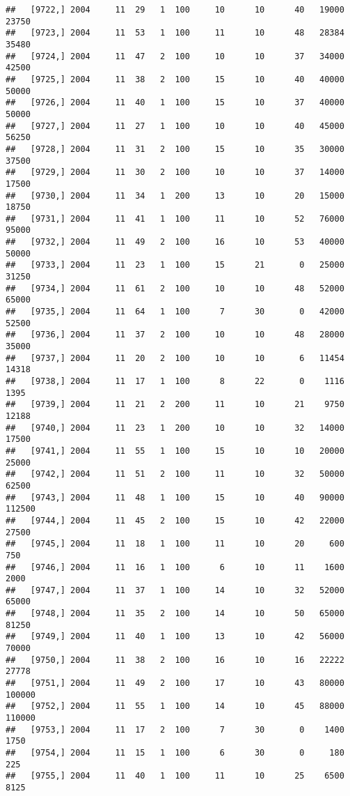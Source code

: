 \documentclass{article}\usepackage[]{graphicx}\usepackage[]{color}
\makeatletter
\newenvironment{kframe}{%
 \def\at@end@of@kframe{}%
 \ifinner\ifhmode%
  \def\at@end@of@kframe{\end{minipage}}%
  \begin{minipage}{\columnwidth}%
 \fi\fi%
 \def\FrameCommand##1{\hskip\@totalleftmargin \hskip-\fboxsep
 \colorbox{shadecolor}{##1}\hskip-\fboxsep
     \hskip-\linewidth \hskip-\@totalleftmargin \hskip\columnwidth}%
 \MakeFramed {\advance\hsize-\width
   \@totalleftmargin\z@ \linewidth\hsize
   \@setminipage}}%
 {\par\unskip\endMakeFramed%
 \at@end@of@kframe}
\newenvironment{knitrout}{}{} %
\makeatother
\begin{document}
\begin{knitrout}
\begin{kframe}
\begin{verbatim}
##   [9722,] 2004     11  29   1  100     10      10      40   19000   23750
##   [9723,] 2004     11  53   1  100     11      10      48   28384   35480
##   [9724,] 2004     11  47   2  100     10      10      37   34000   42500
##   [9725,] 2004     11  38   2  100     15      10      40   40000   50000
##   [9726,] 2004     11  40   1  100     15      10      37   40000   50000
##   [9727,] 2004     11  27   1  100     10      10      40   45000   56250
##   [9728,] 2004     11  31   2  100     15      10      35   30000   37500
##   [9729,] 2004     11  30   2  100     10      10      37   14000   17500
##   [9730,] 2004     11  34   1  200     13      10      20   15000   18750
##   [9731,] 2004     11  41   1  100     11      10      52   76000   95000
##   [9732,] 2004     11  49   2  100     16      10      53   40000   50000
##   [9733,] 2004     11  23   1  100     15      21       0   25000   31250
##   [9734,] 2004     11  61   2  100     10      10      48   52000   65000
##   [9735,] 2004     11  64   1  100      7      30       0   42000   52500
##   [9736,] 2004     11  37   2  100     10      10      48   28000   35000
##   [9737,] 2004     11  20   2  100     10      10       6   11454   14318
##   [9738,] 2004     11  17   1  100      8      22       0    1116    1395
##   [9739,] 2004     11  21   2  200     11      10      21    9750   12188
##   [9740,] 2004     11  23   1  200     10      10      32   14000   17500
##   [9741,] 2004     11  55   1  100     15      10      10   20000   25000
##   [9742,] 2004     11  51   2  100     11      10      32   50000   62500
##   [9743,] 2004     11  48   1  100     15      10      40   90000  112500
##   [9744,] 2004     11  45   2  100     15      10      42   22000   27500
##   [9745,] 2004     11  18   1  100     11      10      20     600     750
##   [9746,] 2004     11  16   1  100      6      10      11    1600    2000
##   [9747,] 2004     11  37   1  100     14      10      32   52000   65000
##   [9748,] 2004     11  35   2  100     14      10      50   65000   81250
##   [9749,] 2004     11  40   1  100     13      10      42   56000   70000
##   [9750,] 2004     11  38   2  100     16      10      16   22222   27778
##   [9751,] 2004     11  49   2  100     17      10      43   80000  100000
##   [9752,] 2004     11  55   1  100     14      10      45   88000  110000
##   [9753,] 2004     11  17   2  100      7      30       0    1400    1750
##   [9754,] 2004     11  15   1  100      6      30       0     180     225
##   [9755,] 2004     11  40   1  100     11      10      25    6500    8125

\end{verbatim}
\end{kframe}
\end{knitrout}
\end{document}
